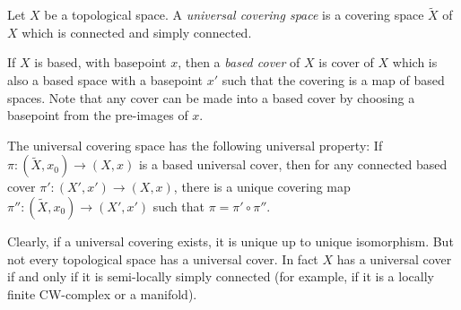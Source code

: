 \documentclass[12pt]{article}
\begin{document}
Let $X$ be a topological space.  A {\em universal covering space} is a covering space $\tilde{X}$ of $X$ which is connected and simply connected. 

If $X$ is based, with basepoint $x$, then a {\em based cover} of $X$ is cover of $X$ which is also a based space with a basepoint $x'$ such that the covering is a map of based spaces. Note that any cover can be made into a based cover by choosing a basepoint from the pre-images of $x$.

The universal covering space has the following universal property: If $\pi:(\tilde X,x_0)\to(X,x)$ is a based universal cover, then for any connected based cover $\pi':(X',x')\to (X,x)$, there is a unique covering map $\pi'':(\tilde X,x_0)\to(X',x')$ such that $\pi=\pi'\circ\pi''$.

Clearly, if a universal covering exists, it is unique up to unique isomorphism.  But not every topological space has a universal cover.  In fact $X$ has a universal cover if and only if it is semi-locally simply connected (for example, if it is a locally finite CW-complex or a manifold).
\end{document}
